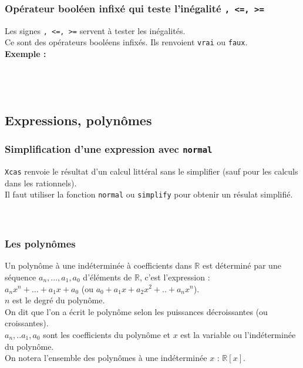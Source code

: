 \documentclass[12pt,a4paper]{book}
\begin{document}
\begin{giacjshere}
\subsubsection{Op\'erateur bool\'een infix\'e qui teste l'in\'egalit\'e {\tt <, >, <=, >=}}
Les signes {\tt <, >, <=, >=} servent \`a tester les in\'egalit\'es. \\
Ce sont des op\'erateurs bool\'eens infix\'es. Ils renvoient {\tt vrai} ou 
{\tt faux}.\\
{\bf Exemple :}\\ 
\\
\\
\\



\subsection{Expressions, polyn\^omes}
\subsubsection{Simplification d'une expression avec {\tt normal}}
{\tt Xcas} renvoie le r\'esultat d'un calcul litt\'eral sans le simplifier 
(sauf pour les calculs dans les rationnels).\\
Il faut utiliser la fonction {\tt normal} ou {\tt simplify}
pour obtenir un r\'esulat simplifi\'e.\\
\\
\\

\subsubsection{Les polyn\^omes}
Un polyn\^ome \`a une ind\'etermin\'ee \`a coefficients dans $\mathbb{R}$ est 
d\'etermin\'e par une 
s\'equence $a_n,...,a_1,a_0$ d'\'el\'ements de $\mathbb{R}$, c'est l'expression :\\ 
$a_nx^n+...+a_1x+a_0$ (ou $a_0+a_1x+a_2x^2+..+a_nx^n$).\\
$n$ est le degr\'e du polyn\^ome.\\
On dit que l'on a \'ecrit le polyn\^ome selon les puissances d\'ecroissantes 
(ou croissantes).\\
$a_n,..a_1,a_0$ sont les coefficients du polyn\^ome et $x$ est la variable ou
l'ind\'etermin\'ee du polyn\^ome.\\
On notera l'ensemble des polyn\^omes \`a une ind\'etermin\'ee $x$ : $\mathbb{R}[x]$.


\end{giacjshere}
\end{document}
